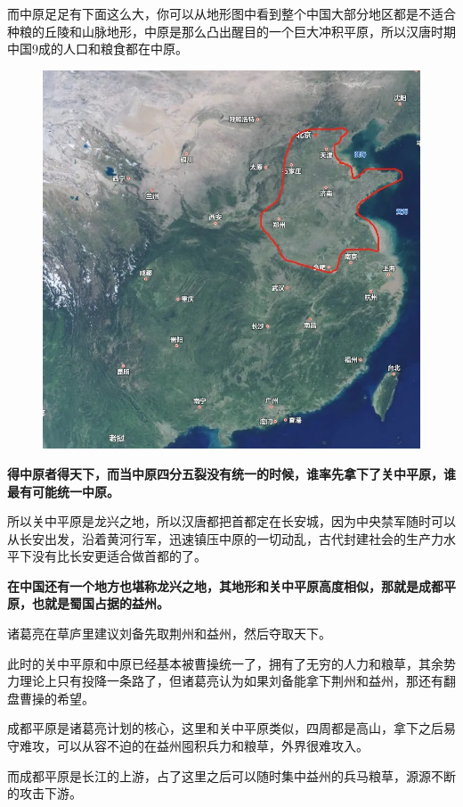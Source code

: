 \documentclass[UTF8, 11pt, oneside]{ctexart}
\newcommand{\zd}[1]{\textbf{\textcolor[RGB]{123,12,0}{#1}}} %
\begin{document}
而中原足足有下面这么大，你可以从地形图中看到整个中国大部分地区都是不适合种粮的丘陵和山脉地形，中原是那么凸出醒目的一个巨大冲积平原，所以汉唐时期中国9成的人口和粮食都在中原。

\begin{figure}[H]
    \centering
    \includegraphics[width=13cm]{2024-08-19-004.jpg}
\end{figure}

\zd{得中原者得天下，而当中原四分五裂没有统一的时候，谁率先拿下了关中平原，谁最有可能统一中原。}

所以关中平原是龙兴之地，所以汉唐都把首都定在长安城，因为中央禁军随时可以从长安出发，沿着黄河行军，迅速镇压中原的一切动乱，古代封建社会的生产力水平下没有比长安更适合做首都的了。

\zd{在中国还有一个地方也堪称龙兴之地，其地形和关中平原高度相似，那就是成都平原，也就是蜀国占据的益州。}

诸葛亮在草庐里建议刘备先取荆州和益州，然后夺取天下。

此时的关中平原和中原已经基本被曹操统一了，拥有了无穷的人力和粮草，其余势力理论上只有投降一条路了，但诸葛亮认为如果刘备能拿下荆州和益州，那还有翻盘曹操的希望。

成都平原是诸葛亮计划的核心，这里和关中平原类似，四周都是高山，拿下之后易守难攻，可以从容不迫的在益州囤积兵力和粮草，外界很难攻入。

而成都平原是长江的上游，占了这里之后可以随时集中益州的兵马粮草，源源不断的攻击下游。
\end{document}
